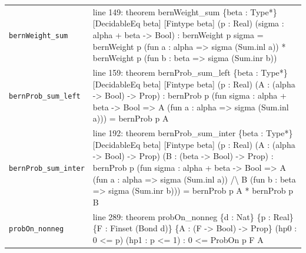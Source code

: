 \documentclass[10pt]{article}
\begin{document}
\begin{longtable}{>{\raggedright\arraybackslash}p{} >{\raggedright\arraybackslash}p{}}
\texttt{bernWeight\_\allowbreak{}sum} & {\ttfamily\scriptsize line 149:\allowbreak{} theorem bernWeight\_\allowbreak{}sum \{beta :\allowbreak{} Type*\allowbreak{}\} [DecidableEq beta] [Fintype beta] (\allowbreak{}p :\allowbreak{} Real)\allowbreak{} (\allowbreak{}sigma :\allowbreak{} alpha +\allowbreak{} beta -\allowbreak{}> Bool)\allowbreak{} :\allowbreak{} bernWeight p sigma =\allowbreak{} bernWeight p (\allowbreak{}fun a :\allowbreak{} alpha =\allowbreak{}> sigma (\allowbreak{}Sum.\allowbreak{}inl a)\allowbreak{})\allowbreak{} *\allowbreak{} bernWeight p (\allowbreak{}fun b :\allowbreak{} beta =\allowbreak{}> sigma (\allowbreak{}Sum.\allowbreak{}inr b)\allowbreak{})\allowbreak{}} \\[0.45em]
\texttt{bernProb\_\allowbreak{}sum\_\allowbreak{}left} & {\ttfamily\scriptsize line 159:\allowbreak{} theorem bernProb\_\allowbreak{}sum\_\allowbreak{}left \{beta :\allowbreak{} Type*\allowbreak{}\} [DecidableEq beta] [Fintype beta] (\allowbreak{}p :\allowbreak{} Real)\allowbreak{} (\allowbreak{}A :\allowbreak{} (\allowbreak{}alpha -\allowbreak{}> Bool)\allowbreak{} -\allowbreak{}> Prop)\allowbreak{} :\allowbreak{} bernProb p (\allowbreak{}fun sigma :\allowbreak{} alpha +\allowbreak{} beta -\allowbreak{}> Bool =\allowbreak{}> A (\allowbreak{}fun a :\allowbreak{} alpha =\allowbreak{}> sigma (\allowbreak{}Sum.\allowbreak{}inl a)\allowbreak{})\allowbreak{})\allowbreak{} =\allowbreak{} bernProb p A} \\[0.45em]
\texttt{bernProb\_\allowbreak{}sum\_\allowbreak{}inter} & {\ttfamily\scriptsize line 192:\allowbreak{} theorem bernProb\_\allowbreak{}sum\_\allowbreak{}inter \{beta :\allowbreak{} Type*\allowbreak{}\} [DecidableEq beta] [Fintype beta] (\allowbreak{}p :\allowbreak{} Real)\allowbreak{} (\allowbreak{}A :\allowbreak{} (\allowbreak{}alpha -\allowbreak{}> Bool)\allowbreak{} -\allowbreak{}> Prop)\allowbreak{} (\allowbreak{}B :\allowbreak{} (\allowbreak{}beta -\allowbreak{}> Bool)\allowbreak{} -\allowbreak{}> Prop)\allowbreak{} :\allowbreak{} bernProb p (\allowbreak{}fun sigma :\allowbreak{} alpha +\allowbreak{} beta -\allowbreak{}> Bool =\allowbreak{}> A (\allowbreak{}fun a :\allowbreak{} alpha =\allowbreak{}> sigma (\allowbreak{}Sum.\allowbreak{}inl a)\allowbreak{})\allowbreak{} /\allowbreak{}\textbackslash{} B (\allowbreak{}fun b :\allowbreak{} beta =\allowbreak{}> sigma (\allowbreak{}Sum.\allowbreak{}inr b)\allowbreak{})\allowbreak{})\allowbreak{} =\allowbreak{} bernProb p A *\allowbreak{} bernProb p B} \\[0.45em]
\texttt{probOn\_\allowbreak{}nonneg} & {\ttfamily\scriptsize line 289:\allowbreak{} theorem probOn\_\allowbreak{}nonneg \{d :\allowbreak{} Nat\} \{p :\allowbreak{} Real\} \{F :\allowbreak{} Finset (\allowbreak{}Bond d)\allowbreak{}\} \{A :\allowbreak{} (\allowbreak{}F -\allowbreak{}> Bool)\allowbreak{} -\allowbreak{}> Prop\} (\allowbreak{}hp0 :\allowbreak{} 0 <=\allowbreak{} p)\allowbreak{} (\allowbreak{}hp1 :\allowbreak{} p <=\allowbreak{} 1)\allowbreak{} :\allowbreak{} 0 <=\allowbreak{} ProbOn p F A} \\[0.45em]

\end{longtable}
\end{document}
